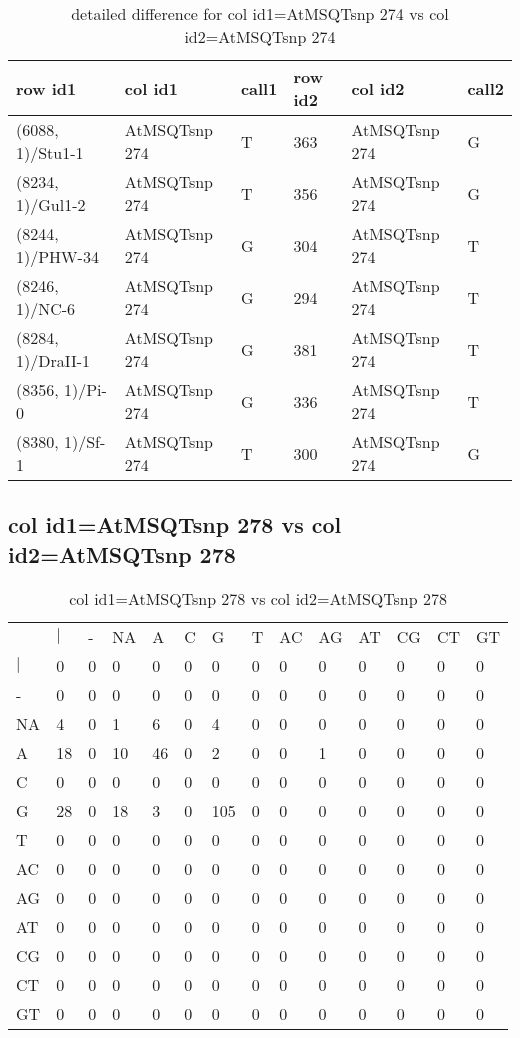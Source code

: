 \begin{center}
\begin{longtable}{|l|l|l|l|l|l|}
\caption{detailed difference for col id1=AtMSQTsnp 274 vs col id2=AtMSQTsnp 274} \label{table_dm623}\\
\hline
row id1&col id1&call1&row id2&col id2&call2\\
\hline
(6088, 1)/Stu1-1&AtMSQTsnp 274&T&363&AtMSQTsnp 274&G\\
(8234, 1)/Gul1-2&AtMSQTsnp 274&T&356&AtMSQTsnp 274&G\\
(8244, 1)/PHW-34&AtMSQTsnp 274&G&304&AtMSQTsnp 274&T\\
(8246, 1)/NC-6&AtMSQTsnp 274&G&294&AtMSQTsnp 274&T\\
(8284, 1)/DraII-1&AtMSQTsnp 274&G&381&AtMSQTsnp 274&T\\
(8356, 1)/Pi-0&AtMSQTsnp 274&G&336&AtMSQTsnp 274&T\\
(8380, 1)/Sf-1&AtMSQTsnp 274&T&300&AtMSQTsnp 274&G\\
\hline
\end{longtable}
\end{center}

\subsection{col id1=AtMSQTsnp 278 vs col id2=AtMSQTsnp 278}
\begin{center}
\begin{longtable}{|l|l|l|l|l|l|l|l|l|l|l|l|l|l|}
\caption{col id1=AtMSQTsnp 278 vs col id2=AtMSQTsnp 278} \label{table_dm624}\\
\hline
\\
\hline
&$|$&-&NA&A&C&G&T&AC&AG&AT&CG&CT&GT\\
$|$&0&0&0&0&0&0&0&0&0&0&0&0&0\\
-&0&0&0&0&0&0&0&0&0&0&0&0&0\\
NA&4&0&1&6&0&4&0&0&0&0&0&0&0\\
A&18&0&10&46&0&2&0&0&1&0&0&0&0\\
C&0&0&0&0&0&0&0&0&0&0&0&0&0\\
G&28&0&18&3&0&105&0&0&0&0&0&0&0\\
T&0&0&0&0&0&0&0&0&0&0&0&0&0\\
AC&0&0&0&0&0&0&0&0&0&0&0&0&0\\
AG&0&0&0&0&0&0&0&0&0&0&0&0&0\\
AT&0&0&0&0&0&0&0&0&0&0&0&0&0\\
CG&0&0&0&0&0&0&0&0&0&0&0&0&0\\
CT&0&0&0&0&0&0&0&0&0&0&0&0&0\\
GT&0&0&0&0&0&0&0&0&0&0&0&0&0\\
\hline
\end{longtable}
\end{center}

